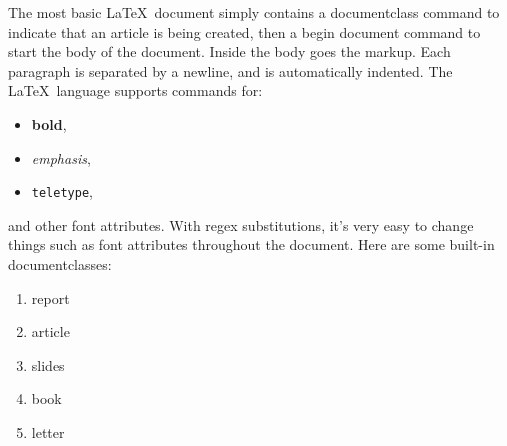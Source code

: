 \documentclass{article}
\begin{document}
The most basic \LaTeX\ document simply contains a documentclass command to
indicate that an article is being created, then a begin document command to
start the body of the document. Inside the body goes the markup.  Each
paragraph is separated by a newline, and is automatically indented.  The \LaTeX\ 
language supports commands for:

\begin{itemize}
  \item \textbf{bold}, 
  \item \emph{emphasis},
  \item \texttt{teletype}, 
\end{itemize}

and other font attributes.  With regex substitutions, it's very easy to change
things such as font attributes throughout the document.  Here are some
built-in documentclasses:

\begin{enumerate}
  \item report
  \item article
  \item slides
  \item book 
  \item letter
\end{enumerate}
\end{document}
